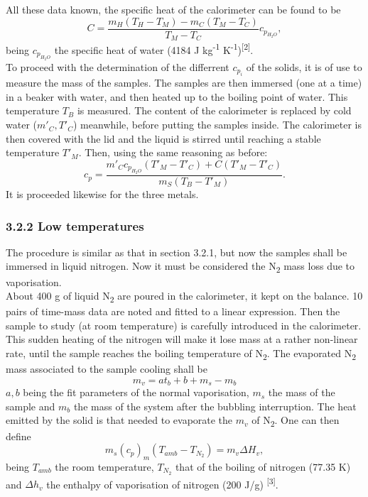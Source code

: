 \documentclass[a4paper, 12pt]{article}
\begin{document}
	All these data known, the specific heat of the calorimeter can be found to be 
	\begin{equation}\label{ccalorimeter}
		C = \frac{m_H (T_H - T_M) - m_C (T_M - T_C)}{T_M - T_C} c_{p_{H_2O}},
	\end{equation}
	being $c_{p_{H_2O}}$ the specific heat of water (4184 J kg\textsuperscript{-1} K\textsuperscript{-1})\textsuperscript{[2]}. \\
	
	To proceed with the determination of the differrent $c_{p_i}$ of the solids, it is of use to measure the mass of the samples. The samples are then immersed (one at a time) in a beaker with water, and then heated up to the boiling point of water. This temperature $T_B$ is measured.  The content of the calorimeter is replaced by cold water ($m'_C, T'_C$) meanwhile, before putting the samples inside. The calorimeter is then covered with the lid and the liquid is stirred until reaching a stable temperature $T'_M$. Then, using the same reasoning as before:
	\begin{equation}\label{cpsolidhot}
		c_p = \frac{m'_C c_{p_{H_2O}} (T'_M - T'_C) + C(T'_M - T'_C)}{m_S (T_B - T'_M)}.
	\end{equation}
	It is proceeded likewise for the three metals.
	\subsubsection{3.2.2 Low temperatures}
	The procedure is similar as that in section 3.2.1, but now the samples shall be immersed in liquid nitrogen. Now it must be considered the N\textsubscript{2} mass loss due to vaporisation. \\
	
	About 400 g of liquid N\textsubscript{2} are poured in the calorimeter, it kept on the balance. 10 pairs of time-mass data are noted and fitted to a linear expression. Then the sample to study (at room temperature) is carefully introduced in the calorimeter. This sudden heating of the nitrogen will make it lose mass at a rather non-linear rate, until the sample reaches the boiling temperature of N\textsubscript{2}. The evaporated N\textsubscript{2} mass associated to the sample cooling shall be
	\begin{equation}\label{masscool}
		m_v = at_b + b + m_s - m_b
	\end{equation}
	$a, b$ being the fit parameters of the normal vaporisation, $m_s$ the mass of the sample and $m_b$ the mass of the system after the bubbling interruption. The heat  emitted by the solid is that needed to evaporate the $m_v$ of N\textsubscript{2}. One can then define
	\begin{equation}\label{cpsolidcold}
		m_s (c_p)_m (T_{amb} - T_{N_2}) = m_v \Delta H_v,
	\end{equation}
	being $T_{amb}$ the room temperature, $T_{N_2}$ that of the boiling of nitrogen (77.35 K) and $\Delta h_v$ the enthalpy of vaporisation of nitrogen (200 J/g) \textsuperscript{[3]}.
\end{document}

